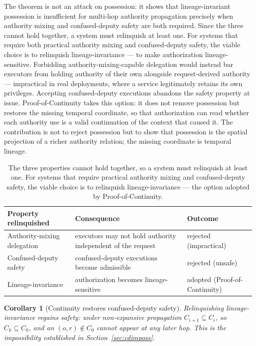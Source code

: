 \documentclass[11pt]{article}
\newtheorem{corollary}{Corollary}
\begin{document}
The theorem is not an attack on possession: it shows that lineage-invariant
possession is insufficient for multi-hop authority propagation precisely when
authority mixing and confused-deputy safety are both required. Since the three
cannot hold together, a system must relinquish at least one. For systems that
require both practical authority mixing and confused-deputy safety, the viable
choice is to relinquish lineage-invariance --- to make authorization
lineage-sensitive. Forbidding authority-mixing-capable delegation would instead
bar executors from holding authority of their own alongside request-derived
authority --- impractical in real deployments, where a service legitimately
retains its own privileges. Accepting confused-deputy executions abandons the
safety property at issue. Proof-of-Continuity takes this
option: it does not remove possession but restores the missing temporal
coordinate, so that authorization can read whether each authority use is a valid
continuation of the context that caused it. The contribution is not to reject
possession but to show that possession is the spatial projection of a richer
authority relation; the missing coordinate is temporal lineage.

\begin{table}[ht]
\centering
\small
\begin{tabular}{@{}p{2.9cm}p{5.0cm}p{3.1cm}@{}}
\toprule
Property relinquished & Consequence & Outcome \\
\midrule
Authority-mixing delegation & executors may not hold authority independent of the request & rejected (impractical) \\
Confused-deputy safety & confused-deputy executions become admissible & rejected (unsafe) \\
Lineage-invariance & authorization becomes lineage-sensitive & adopted (Proof-of-Continuity) \\
\bottomrule
\end{tabular}
\caption{The three properties cannot hold together, so a system must relinquish
at least one. For systems that require practical authority mixing and
confused-deputy safety, the viable choice is to relinquish lineage-invariance ---
the option adopted by Proof-of-Continuity.}
\label{tab:tradeoff}
\end{table}

\begin{corollary}[Continuity restores confused-deputy safety]
Relinquishing lineage-invariance regains safety: under non-expansive propagation
$C_{i+1} \subseteq C_i$, so $C_k \subseteq C_0$, and an $(o,r) \notin C_0$ cannot
appear at any later hop. This is the impossibility established in
Section~\ref{sec:cdimposs}.
\end{corollary}
\end{document}
